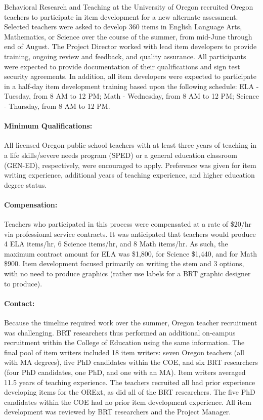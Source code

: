 \documentclass[]{article}
\let\oldparagraph\paragraph
\renewcommand{\paragraph}[1]{\oldparagraph{#1}\mbox{}}
\begin{document}
Behavioral Research and Teaching at the University of Oregon recruited
Oregon teachers to participate in item development for a new alternate
assessment. Selected teachers were asked to develop 360 items in English
Language Arts, Mathematics, or Science over the course of the summer,
from mid-June through end of August. The Project Director worked with
lead item developers to provide training, ongoing review and feedback,
and quality assurance. All participants were expected to provide
documentation of their qualifications and sign test security agreements.
In addition, all item developers were expected to participate in a
half-day item development training based upon the following schedule:
ELA - Tuesday, from 8 AM to 12 PM; Math - Wednesday, from 8 AM to 12 PM;
Science - Thursday, from 8 AM to 12 PM.

\paragraph{Minimum Qualifications:}\label{minimum-qualifications}

All licensed Oregon public school teachers with at least three years of
teaching in a life skills/severe needs program (SPED) or a general
education classroom (GEN-ED), respectively, were encouraged to apply.
Preference was given for item writing experience, additional years of
teaching experience, and higher education degree status.

\paragraph{Compensation:}\label{compensation}

Teachers who participated in this process were compensated at a rate of
\$20/hr via professional service contracts. It was anticipated that
teachers would produce 4 ELA items/hr, 6 Science items/hr, and 8 Math
items/hr. As such, the maximum contract amount for ELA was \$1,800, for
Science \$1,440, and for Math \$900. Item development focused primarily
on writing the stem and 3 options, with no need to produce graphics
(rather use labels for a BRT graphic designer to produce).

\paragraph{Contact:}\label{contact}

Because the timeline required work over the summer, Oregon teacher
recruitment was challenging. BRT researchers thus performed an
additional on-campus recruitment within the College of Education using
the same information. The final pool of item writers included 18 item
writers: seven Oregon teachers (all with MA degrees), five PhD
candidates within the COE, and six BRT researchers (four PhD candidates,
one PhD, and one with an MA). Item writers averaged 11.5 years of
teaching experience. The teachers recruited all had prior experience
developing items for the ORExt, as did all of the BRT researchers. The
five PhD candidates within the COE had no prior item development
experience. All item development was reviewed by BRT researchers and the
Project Manager.
\end{document}
